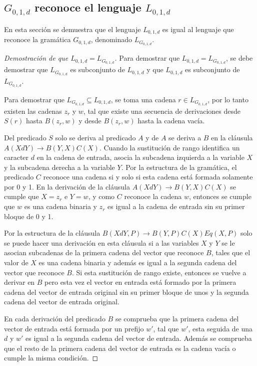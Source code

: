 \documentclass[12pt]{article}
\begin{document}
\subsection{$G_{0,1,d}$ reconoce el lenguaje $L_{0,1,d}$}
\label{sec:demg01d}

En esta sección se demuestra que el lenguaje $L_{0,1,d}$ es igual al lenguaje que reconoce la gramática $G_{0,1,d}$,
denominado $L_{G_{0,1,d}}$.

\begin{proof}[Demostración de que $L_{0,1,d}=L_{G_{0,1,d}}$]
    
    Para demostrar que $L_{0,1,d}=L_{G_{0,1,d}}$, se debe demostrar que $L_{G_{0,1,d}}$ es subconjunto de $L_{0,1,d}$ y que
    $L_{0,1,d}$ es subconjunto de $L_{G_{0,1,d}}$. 
    
    Para demostrar que $L_{G_{0,1,d}}\subseteq L_{0,1,d}$, se toma una cadena $r\in L_{G_{0,1,d}}$, por lo tanto existen las cadenas $z_r$ y $w$, tal que existe una secuencia de derivaciones desde $S(r)$ hasta $B(z_r,w)$ y desde $B(z_r,w)$ hasta la cadena vacía.
    
    Del predicado $S$ solo se deriva al predicado $A$ y de $A$ se deriva a $B$ en la cláusula $A(XdY)\to B(Y,X)C(X)$.  Cuando la sustitución de rango identifica un caracter $d$ en la cadena de entrada, asocia la subcadena izquierda a la variable $X$ y la subcadena derecha a la variable $Y$. Por la estructura de la gramática, el predicado $C$ reconoce una cadena si y solo si esta cadena está formada solamente por 0 y 1. En la derivación de la cláusula $A(XdY)\to B(Y,X)C(X)$ se cumple que $X=z_r$ e $Y=w$, y como $C$ reconoce la cadena $w$, entonces se cumple que $w$ es una cadena binaria y $z_r$ es igual a la cadena de entrada sin su primer bloque de 0 y 1.
    
    Por la estructura de la cláusula $B(XdY,P)\to B(Y,P) C(X) Eq(X,P)$ solo se puede hacer una derivación en esta cláusula si a las variables $X$ y $Y$ se le asocian subcadenas de la primera cadena del vector que reconoce $B$, tales que el valor de $X$ es una cadena binaria y además es igual a la segunda cadena del vector que reconoce $B$. Si esta sustitución de rango existe, entonces se vuelve a derivar en $B$ pero esta vez el vector en entrada está formado por la primera cadena del vector de entrada original sin su primer bloque de unos y la segunda cadena del vector de entrada original.
    
    En cada derivación del predicado $B$ se comprueba que la primera cadena del vector de entrada está formada por un prefijo $w'$, tal que $w'$, esta seguida de una $d$ y $w'$ es igual a la segunda cadena del vector de entrada. Además se comprueba que el resto de la primera cadena del vector de entrada es la cadena vacía o cumple la misma condición.
    

\end{proof}
\end{document}
